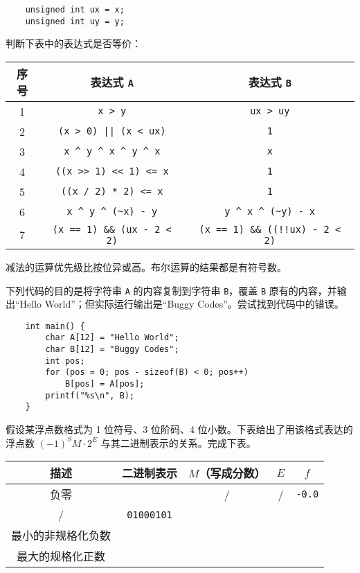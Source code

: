 \begin{problems}
\begin{verbatim}
    unsigned int ux = x;
    unsigned int uy = y;
		\end{verbatim}
		判断下表中的表达式是否等价：
		\begin{table}[H]
			\centering
			\begin{tabular}{|c|c|c|}
				\hline
				序号 & 表达式 \verb|A| & 表达式 \verb|B| \\ \hline
				1 & \verb|x > y| & \verb|ux > uy| \\ \hline
				2 & \verb+(x > 0) || (x < ux)+ & \verb|1| \\ \hline
				3 & \verb|x ^ y ^ x ^ y ^ x| & \verb|x| \\ \hline
				4 & \verb|((x >> 1) << 1) <= x| & \verb|1| \\ \hline
				5 & \verb|((x / 2) * 2) <= x| & \verb|1| \\ \hline
				6 & \verb|x ^ y ^ (~x) - y| & \verb|y ^ x ^ (~y) - x| \\ \hline
				7 & \verb|(x == 1) && (ux - 2 < 2)| & \verb|(x == 1) && ((!!ux) - 2 < 2)| \\ \hline
			\end{tabular}
		\end{table}
		\begin{hint}
			减法的运算优先级比按位异或高。布尔运算的结果都是有符号数。
		\end{hint}
		\pro 下列代码的目的是将字符串 \texttt{A} 的内容复制到字符串 \texttt{B}，覆盖 \texttt{B} 原有的内容，并输出“Hello World”；但实际运行输出是“Buggy Codes”。尝试找到代码中的错误。
		\begin{verbatim}
    int main() {
        char A[12] = "Hello World";
        char B[12] = "Buggy Codes";
        int pos;
        for (pos = 0; pos - sizeof(B) < 0; pos++)
            B[pos] = A[pos];
        printf("%s\n", B);
    }
		\end{verbatim}
		\pro 假设某浮点数格式为 1 位符号、3 位阶码、4 位小数。下表给出了用该格式表达的浮点数 $(-1)^SM \cdot 2^E$ 与其二进制表示的关系。完成下表。
		\begin{table}[H]
			\centering
			\begin{tabular}{|c|c|c|c|c|}
				\hline
				描述 & 二进制表示 & $M$（写成分数） & $E$ & $f$ \\ \hline
				负零 &  & / & / & \texttt{-0.0} \\ \hline
				/ & \verb|01000101| &  &  &  \\ \hline
				最小的非规格化负数 &  &  &  &  \\ \hline
				最大的规格化正数 &  &  &  &  \\ \hline

\end{tabular}
\end{table}
\end{problems}
